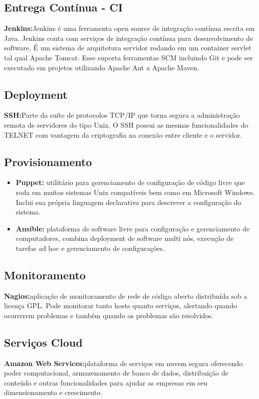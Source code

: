 \subsection{Entrega Contínua - CI}
\textbf{Jenkins:}Jenkins é uma ferramenta open source de integração contínua escrita em Java. Jenkins conta com serviços de integração contínua para desenvolvimento de software. É um sistema de arquitetura servidor rodando em um container servlet tal qual Apache Tomcat. Esse suporta ferramentas SCM incluindo Git e pode ser executado em projetos utilizando Apache Ant a Apache Maven.

\subsection{Deployment}
\textbf{SSH:}Parte da suíte de protocolos TCP/IP que torna segura a administração remota de servidores do tipo Unix. O SSH possui as mesmas funcionalidades do TELNET com vantagem da criptografia na conexão entre cliente e o servidor.

\subsection{Provisionamento}

\begin{itemize}

\item \textbf{Puppet:} utilitário para gerenciamento de configuração de código livre que roda em muitos sistemas Unix compatíveis bem como em Microsoft Windows. Inclui sua própria linguagem declarativa para descrever a configuração do sistema.

\item \textbf{Ansible:} plataforma de software livre para configuração e gerenciamento de computadores, combina deployment de software multi nós, execução de tarefas ad hoc e gerenciamento de configurações.

\end{itemize}

\subsection{Monitoramento}

\textbf{Nagios:}aplicação de monitoramento de rede de código aberto distribuída sob a licença GPL. Pode monitorar tanto hosts quanto serviços, alertando quando ocorrerem problemas e também quando os problemas são resolvidos.

\subsection{Serviços Cloud}

\textbf{Amazon Web Services:}plataforma de serviços em nuvem segura oferecendo poder computacional, armazenamento de banco de dados, distribuição de conteúdo e outras funcionalidades para ajudar as empresas em seu dimensionamento e crescimento.


